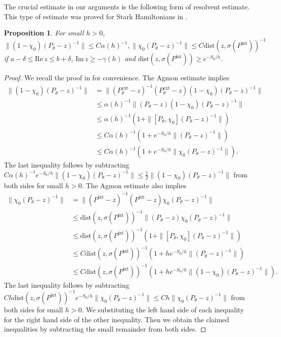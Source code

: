 \documentclass{article}
\theoremstyle{plain}
\newtheorem{prop}{Proposition}[section]
\theoremstyle{definition}
\theoremstyle{remark}
\newcommand{\RE}{\mathrm{Re}\,}
\newcommand{\IM}{\mathrm{Im}\,}
\begin{document}
The crucial estimate in our arguments is the following form of resolvent estimate. 
This type of estimate was proved for Stark Hamiltonians in \cite[Proposition~4.1]{K1}. 
\begin{prop}\label{prop-resolvent}
For small $h>0$,  
\[\|(1-\chi_0)(P_{\theta}-z)^{-1}\|\le C\alpha(h)^{-1}, \|\chi_0(P_{\theta}-z)^{-1}\|
\le C\mathrm{dist}(z, \sigma(P^{\mathrm{int}}))^{-1}\]
if $a-\delta \le \RE z \le b+\delta$, $\IM z \ge -\gamma(h)$ 
and $\mathrm{dist}(z, \sigma(P^{\mathrm{int}}))\ge e^{-S_0/h}$.
\end{prop}
\begin{proof}
We recall the proof in \cite{K1} for convenience.
The Agmon estimate implies 
\begin{align*}
\|(1-\chi_0)(P_{\theta}-z)^{-1}\|&
=\|(P_{\theta}^{\mathrm{ext}}-z)^{-1}(P_{\theta}^{\mathrm{ext}}-z)(1-\chi_0)(P_{\theta}-z)^{-1}\|\\
&\le\alpha(h)^{-1}\|(P_{\theta}-z)(1-\chi_0)(P_{\theta}-z)^{-1}\|\\
&\le\alpha(h)^{-1}(1+\|[P_{\theta}, \chi_0](P_{\theta}-z)^{-1}\|)\\ 
&\le C\alpha(h)^{-1}(1+e^{-S_0/{h}}\|(P_{\theta}-z)^{-1}\|)\\
&\le C\alpha(h)^{-1}(1+e^{-S_0/{h}}\|\chi_0(P_{\theta}-z)^{-1}\|).
\end{align*}
The last inequality follows by subtracting $C\alpha(h)^{-1}e^{-S_0/{h}}\|(1-\chi_0)(P_{\theta}-z)^{-1}\|
\le \frac{1}{2}\|(1-\chi_0)(P_{\theta}-z)^{-1}\|$ from both sides for small $h>0$.
The Agmon estimate also implies 
\begin{align*}
\|\chi_0(P_{\theta}-z)^{-1}\|&= \|(P^{\mathrm{int}}-z)^{-1}(P^{\mathrm{int}}-z)\chi_0(P_{\theta}-z)^{-1}\| \\
&\le \mathrm{dist}(z, \sigma(P^{\mathrm{int}}))^{-1}\|(P_{\theta}-z)\chi_0(P_{\theta}-z)^{-1}\| \\
&\le \mathrm{dist}(z, \sigma(P^{\mathrm{int}}))^{-1}(1+\|[P_{\theta},\chi_0](P_{\theta}-z)^{-1}\|) \\
&\le C\mathrm{dist}(z, \sigma(P^{\mathrm{int}}))^{-1}(1+h e^{-S_0/{h}}\|(P_{\theta}-z)^{-1}\|)\\
&\le C\mathrm{dist}(z, \sigma(P^{\mathrm{int}}))^{-1}(1+h e^{-S_0/{h}}\|(1-\chi_0)(P_{\theta}-z)^{-1}\|).
\end{align*}
The last inequality follows by subtracting
$Ch\mathrm{dist}(z, \sigma(P^{\mathrm{int}}))^{-1}e^{-S_0/{h}}\|\chi_0(P_{\theta}-z)^{-1}\|\le 
Ch\|\chi_0(P_{\theta}-z)^{-1}\|$ from both sides for small $h>0$.
We substituting the left hand side of each inequality for the right hand side of the other inequality. 
Then we obtain the claimed inequalities by subtracting the small remainder from both sides. 
\end{proof}
\end{document}
